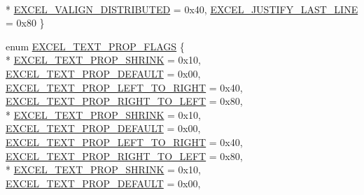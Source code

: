 \begin{DoxyCompactItemize}
\\*
\hyperlink{namespace_excel_format_ae240972daf5ff9a354b943184f8bd3f9a2faf779ddcbe75e3a57502c18785e6f9}{E\+X\+C\+E\+L\+\_\+\+V\+A\+L\+I\+G\+N\+\_\+\+D\+I\+S\+T\+R\+I\+B\+U\+T\+E\+D} = 0x40, 
\hyperlink{namespace_excel_format_ae240972daf5ff9a354b943184f8bd3f9a0c78139ea33294c4ca03abeee3f0eb40}{E\+X\+C\+E\+L\+\_\+\+J\+U\+S\+T\+I\+F\+Y\+\_\+\+L\+A\+S\+T\+\_\+\+L\+I\+N\+E} = 0x80
 \}
\item 
enum \hyperlink{namespace_excel_format_ab7ad43661bd31d6c45a48b2d87beeb08}{E\+X\+C\+E\+L\+\_\+\+T\+E\+X\+T\+\_\+\+P\+R\+O\+P\+\_\+\+F\+L\+A\+G\+S} \{ \\*
\hyperlink{namespace_excel_format_ab7ad43661bd31d6c45a48b2d87beeb08a4129a185a29aa743bd152101d1ea6a32}{E\+X\+C\+E\+L\+\_\+\+T\+E\+X\+T\+\_\+\+P\+R\+O\+P\+\_\+\+S\+H\+R\+I\+N\+K} = 0x10, 
\hyperlink{namespace_excel_format_ab7ad43661bd31d6c45a48b2d87beeb08af51cfd801244d50ffc9d00a7e875e806}{E\+X\+C\+E\+L\+\_\+\+T\+E\+X\+T\+\_\+\+P\+R\+O\+P\+\_\+\+D\+E\+F\+A\+U\+L\+T} = 0x00, 
\hyperlink{namespace_excel_format_ab7ad43661bd31d6c45a48b2d87beeb08aeba34a7f1ef682460327a3fd61d43598}{E\+X\+C\+E\+L\+\_\+\+T\+E\+X\+T\+\_\+\+P\+R\+O\+P\+\_\+\+L\+E\+F\+T\+\_\+\+T\+O\+\_\+\+R\+I\+G\+H\+T} = 0x40, 
\hyperlink{namespace_excel_format_ab7ad43661bd31d6c45a48b2d87beeb08ad8688cac1fd8a5be909666bdddade639}{E\+X\+C\+E\+L\+\_\+\+T\+E\+X\+T\+\_\+\+P\+R\+O\+P\+\_\+\+R\+I\+G\+H\+T\+\_\+\+T\+O\+\_\+\+L\+E\+F\+T} = 0x80, 
\\*
\hyperlink{namespace_excel_format_ab7ad43661bd31d6c45a48b2d87beeb08a4129a185a29aa743bd152101d1ea6a32}{E\+X\+C\+E\+L\+\_\+\+T\+E\+X\+T\+\_\+\+P\+R\+O\+P\+\_\+\+S\+H\+R\+I\+N\+K} = 0x10, 
\hyperlink{namespace_excel_format_ab7ad43661bd31d6c45a48b2d87beeb08af51cfd801244d50ffc9d00a7e875e806}{E\+X\+C\+E\+L\+\_\+\+T\+E\+X\+T\+\_\+\+P\+R\+O\+P\+\_\+\+D\+E\+F\+A\+U\+L\+T} = 0x00, 
\hyperlink{namespace_excel_format_ab7ad43661bd31d6c45a48b2d87beeb08aeba34a7f1ef682460327a3fd61d43598}{E\+X\+C\+E\+L\+\_\+\+T\+E\+X\+T\+\_\+\+P\+R\+O\+P\+\_\+\+L\+E\+F\+T\+\_\+\+T\+O\+\_\+\+R\+I\+G\+H\+T} = 0x40, 
\hyperlink{namespace_excel_format_ab7ad43661bd31d6c45a48b2d87beeb08ad8688cac1fd8a5be909666bdddade639}{E\+X\+C\+E\+L\+\_\+\+T\+E\+X\+T\+\_\+\+P\+R\+O\+P\+\_\+\+R\+I\+G\+H\+T\+\_\+\+T\+O\+\_\+\+L\+E\+F\+T} = 0x80, 
\\*
\hyperlink{namespace_excel_format_ab7ad43661bd31d6c45a48b2d87beeb08a4129a185a29aa743bd152101d1ea6a32}{E\+X\+C\+E\+L\+\_\+\+T\+E\+X\+T\+\_\+\+P\+R\+O\+P\+\_\+\+S\+H\+R\+I\+N\+K} = 0x10, 
\hyperlink{namespace_excel_format_ab7ad43661bd31d6c45a48b2d87beeb08af51cfd801244d50ffc9d00a7e875e806}{E\+X\+C\+E\+L\+\_\+\+T\+E\+X\+T\+\_\+\+P\+R\+O\+P\+\_\+\+D\+E\+F\+A\+U\+L\+T} = 0x00, 

\end{DoxyCompactItemize}
